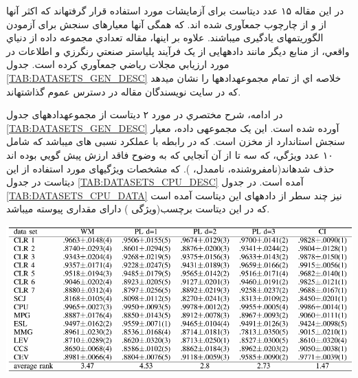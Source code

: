 \documentclass[journal]{IEEEtran}
\newcommand{\نیمفاصله}{\halfspace}
\renewcommand{\ }{\halfspace}
\renewcommand{\یا}{یادگیری\ ارجحیت }
\newcommand{\یم}{یادگیری\ ماشین }
\renewcommand{\تر}{تابع رتبه\ بند }
\newcommand{\ار}{ارجحیت }
\renewcommand{\|}[1][.3em]{\hspace{#1}|\hspace{#1}}
\renewcommand{\,}[1][.3em]{,\hspace{#1}}
\begin{document}
\زیرقسمت{داده\ ها}
در این مقاله ۱۵ عدد دیتاست برای آزمایشات مورد استفاده قرار گرفته\ اند که اکثر آن\ ها از  و از چارچوب  جمع\ آوری شده اند. که همگی آن\ ها معیار\ های سنجش برای آزمودن الگوریتم\ های یادگیری می\ باشند. علاوه بر اين\ ها، مقاله تعدادي مجموعه داده از دنياي واقعي، از منابع ديگر مانند داده\ هایی از يک فرآيند پلي\ استر صنعتي رنگرزي و اطلاعات در مورد ارزيابي مجلات رياضي جمع\ آوري کرده است. جدول
\ref{TAB:DATASETS_GEN_DESC}
خلاصه اي از تمام مجموعه\ داده\ ها را نشان مي\ دهد که در سایت نویسندگان مقاله در دسترس عموم گذاشته\ اند.

در ادامه، شرح مختصري در مورد ۲ دیتاست از مجموعه\ داده\ های جدول
\ref{TAB:DATASETS_GEN_DESC}
آورده شده است.
 اين يک مجموعه\ ی داده، معیار سنجش استاندارد از مخزن  است. که در رابطه با عملکرد نسبی های می\ باشد که شامل ۱۰ عدد ويژگي، که سه تا از آن آنجايي که به وضوح فاقد ارزش پيش گويي بوده اند حذف شده\ اند(نام\ فروشنده، نام\ مدل، ). که مشخصات ویژگی\ های مورد استفاده از این دیتاست در جدول
\ref{TAB:DATASETS_CPU_DESC}
آمده است. در جدول
\ref{TAB:DATASETS_CPU_DATA}
نیز چند سطر از داده\ های این دیتاست آمده است که در این دیتاست برچسب(ویژگی ) دارای مقداری پیوسته می\ باشد.

\begin{table}[ht]
    \begin{adjustwidth}{-.in}{0in}
    \centering
    \includegraphics[width=.8\textwidth]{results_1}
    \end{adjustwidth}
    \caption{مقایسه\ ی دقت روش\ های متفاوت با روش
با کرنل\ های\\ درجات ۱ تا ۳
و همچنین روش معمول میانگین وزنی    
    }\label{TAB:RESULTS_1}
\end{table}
\end{document}
